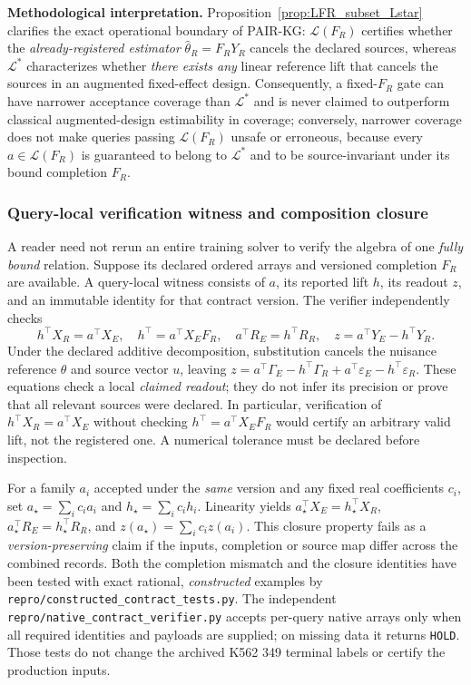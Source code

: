 \documentclass[11pt]{article}
\begin{document}
\noindent\textbf{Methodological interpretation.} Proposition~\ref{prop:LFR_subset_Lstar} clarifies the exact operational boundary of PAIR-KG: $\mathcal{L}(F_R)$ certifies whether the \emph{already-registered estimator} $\widehat{\theta}_R = F_R Y_R$ cancels the declared sources, whereas $\mathcal{L}^*$ characterizes whether \emph{there exists any} linear reference lift that cancels the sources in an augmented fixed-effect design. Consequently, a fixed-$F_R$ gate can have narrower acceptance coverage than $\mathcal{L}^*$ and is never claimed to outperform classical augmented-design estimability in coverage; conversely, narrower coverage does not make queries passing $\mathcal{L}(F_R)$ unsafe or erroneous, because every $a \in \mathcal{L}(F_R)$ is guaranteed to belong to $\mathcal{L}^*$ and to be source-invariant under its bound completion $F_R$.

\subsubsection{Query-local verification witness and composition closure}
\label{supp:localwitness}
A reader need not rerun an entire training solver to verify the algebra of one
\emph{fully bound} relation. Suppose its declared ordered arrays and versioned
completion $F_R$ are available. A query-local witness consists of $a$, its
reported lift $h$, its readout $z$, and an immutable identity for that
contract version. The verifier independently checks
\[
 h^\top X_R=a^\top X_E,\quad h^\top=a^\top X_EF_R,\quad
 a^\top R_E=h^\top R_R,\quad z=a^\top Y_E-h^\top Y_R.
\]
Under the declared additive decomposition, substitution cancels the nuisance
reference $\theta$ and source vector $u$, leaving
$z=a^\top\Gamma_E-h^\top\Gamma_R+
 a^\top\varepsilon_E-h^\top\varepsilon_R$.
These equations check a local \emph{claimed readout}; they do not infer its
precision or prove that all relevant sources were declared. In particular,
verification of $h^\top X_R=a^\top X_E$ without checking
$h^\top=a^\top X_EF_R$ would certify an arbitrary valid lift, not the
registered one. A numerical tolerance must be declared before inspection.

For a family $a_i$ accepted under the \emph{same} version and any fixed real
coefficients $c_i$, set $a_\star=\sum_i c_i a_i$ and
$h_\star=\sum_i c_i h_i$. Linearity yields
$a_\star^\top X_E=h_\star^\top X_R$,
$a_\star^\top R_E=h_\star^\top R_R$, and
$z(a_\star)=\sum_i c_i z(a_i)$.
This closure property fails as a \emph{version-preserving} claim if the inputs,
completion or source map differ across the combined records. Both the
completion mismatch and the closure identities have been tested with exact
rational, \emph{constructed} examples by
\texttt{repro/constructed\_contract\_tests.py}. The independent
\texttt{repro/native\_contract\_verifier.py} accepts per-query native arrays
only when all required identities and payloads are supplied; on missing data
it returns \texttt{HOLD}. Those tests do not change the archived K562 349
terminal labels or certify the production inputs.
\end{document}
